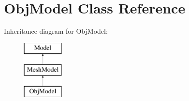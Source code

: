 \hypertarget{classObjModel}{\section{Obj\-Model Class Reference}
\label{classObjModel}
}
Inheritance diagram for Obj\-Model\-:\begin{figure}[H]
\begin{center}
\leavevmode
\includegraphics[height=3.000000cm]{classObjModel}
\end{center}
\end{figure}
